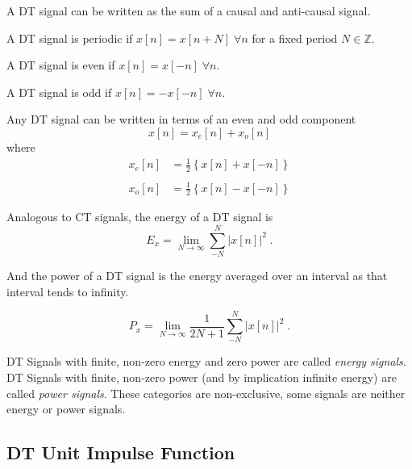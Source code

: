 A DT signal can be written as the sum of a causal and anti-causal signal.

A DT signal is periodic if $x[n] = x[n + N] \; \forall n$ for a fixed period $N \in \mathbb{Z}$.

A DT signal is even if $x[n] = x[-n] \; \forall n$. 

A DT signal is odd if $x[n] = -x[-n] \; \forall n$.

Any DT signal can be written in terms of an even and odd component
\[
x[n] = x_e[n] + x_o[n] 
\]
where 
\[
\begin{array}{ll}
x_e[n] &= \frac{1}{2}\left\{x[n] + x[-n]\right\} \\
& \\
x_o[n] &= \frac{1}{2}\left\{x[n] - x[-n]\right\}
\end{array}
\]

Analogous to CT signals, the energy of a DT signal is
\[
E_x = \lim_{N\rightarrow\infty} \sum\limits_{-N}^N \lvert x[n]\rvert^2 \; .
\]

And the power of a DT signal is the energy averaged over an interval as that interval tends to infinity.

\[
P_x = \lim_{N\rightarrow\infty} \frac{1}{2N+1} \sum\limits_{-N}^N \lvert x[n]\rvert^2 \; .
\]

DT Signals with finite, non-zero energy and zero power are called {\it energy signals}. DT Signals with finite, non-zero power (and by implication infinite energy) are called {\it power signals}. These categories are non-exclusive, some signals are neither energy or power signals.

\subsection{DT Unit Impulse Function}


